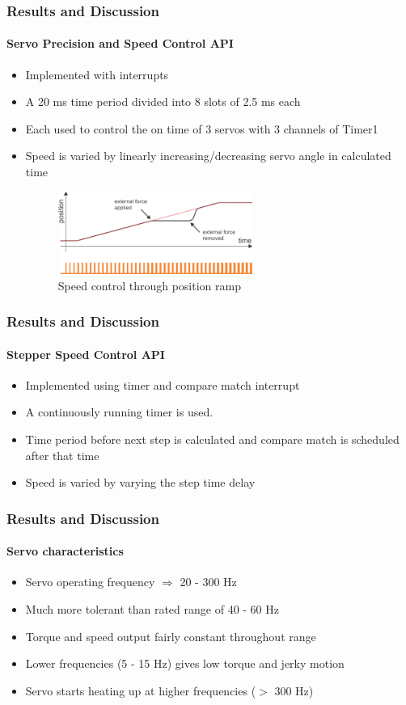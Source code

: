 \documentclass[table,10pt,red]{beamer}	%
\begin{document}
\begin{frame}
	\frametitle{Results and Discussion}
	\framesubtitle{Servo Precision and Speed Control API}
	\begin{itemize}
		\item Implemented with interrupts
		\item A 20 ms time period divided into 8 slots of 2.5 ms each
		\item Each used to control the on time of 3 servos with 3 channels of Timer1
		\item Speed is varied by linearly increasing/decreasing servo angle in calculated time
		\begin{figure}
			\includegraphics[width=0.6\textwidth]{ramp}
			\caption{Speed control through position ramp}
		\end{figure}
	\end{itemize}
\end{frame}

\begin{frame}
	\frametitle{Results and Discussion}
	\framesubtitle{Stepper Speed Control API}
	\begin{itemize}
		\item Implemented using timer and compare match interrupt
		\item A continuously running timer is used.
		\item Time period before next step is calculated and compare match is scheduled after that time
		\item Speed is varied by varying the step time delay
	\end{itemize}
\end{frame}

\begin{frame}
	\frametitle{Results and Discussion}
	\framesubtitle{Servo characteristics}
	\begin{itemize}
		\item Servo operating frequency $\Rightarrow$ 20 - 300 Hz
		\item Much more tolerant than rated range of 40 - 60 Hz
		\item Torque and speed output fairly constant throughout range
		\item Lower frequencies (5 - 15 Hz) gives low torque and jerky motion
		\item Servo starts heating up at higher frequencies ($>$ 300 Hz)
	\end{itemize}
\end{frame}
\end{document}
